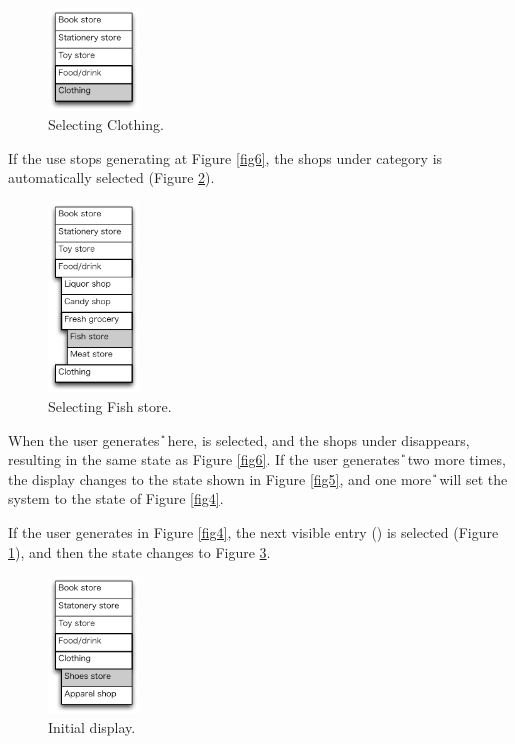 \documentclass{article}
\begin{document}
\begin{figure}[H]
\centerline{\includegraphics[width=24mm,bb=0 0 139 157]{figures/fig8.pdf}}
\caption{Selecting Clothing.}
\label{fig8}
\end{figure}

If the use stops generating {\D} at Figure \ref{fig6},
the shops under category  is automatically selected (Figure \ref{fig7}).

\begin{figure}[H]
\centerline{\includegraphics[width=24mm,bb=0 0 139 292]{figures/fig7.pdf}}
\caption{Selecting Fish store.}
\label{fig7}
\end{figure}

When the user generates {\U} here,  is selected,
and the shops under  disappears, 
resulting in the same state as Figure \ref{fig6}.
If the user generates {\U} two more times, the display changes to the state
shown in Figure \ref{fig5},
and one more {\U} will set the system to the state of Figure \ref{fig4}.

If the user generates {\D} in Figure \ref{fig4}, the next visible entry
() is selected (Figure \ref{fig8}), and then the state changes to Figure \ref{fig9}.

\begin{figure}[H]
\centerline{\includegraphics[width=24mm,bb=0 0 139 211]{figures/fig9.pdf}}
\caption{Initial display.}
\label{fig9}
\end{figure}
\end{document}

